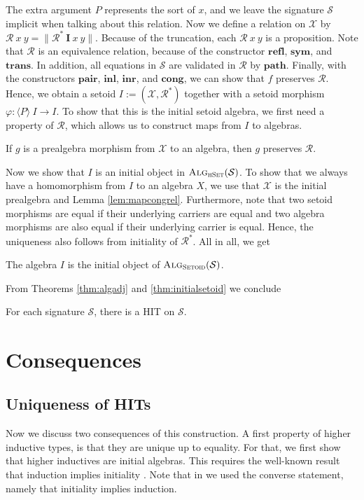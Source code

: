 \documentclass[9pt]{entcs}
\newcommand{\type}[1]{\textsc{#1}}
\newcommand{\constructor}[1]{\mathbf{#1}}
\newcommand{\category}[1]{\textsc{#1}}
\newcommand{\hset}{\type{hSet}} %
\newcommand{\0}{\textbf{0}} %
\newcommand{\trunct}[1]{\lVert #1 \rVert} %
\newcommand{\Def}{:=} %
\newcommand{\setoids}{\category{Setoid}} %
\newcommand{\I}{\constructor{I}} %
\newcommand{\sig}{\mathcal{S}} %
\newcommand{\Alg}[1]{\category{Alg}_{\hset}(#1)} %
\newcommand{\semPT}[1]{\langle #1 \rangle} %
\newcommand{\Algst}[1]{\category{Alg}_{\setoids}(#1)} %
\newcommand{\CRC}{\mathcal{X}} %
\newcommand{\CR}{\mathcal{R}^*} %
\newcommand{\CRR}{\mathcal{R}} %
\newcommand{\CRrefl}{\constructor{refl}} %
\newcommand{\CRsym}{\constructor{sym}} %
\newcommand{\CRtrans}{\constructor{trans}} %
\newcommand{\CRpair}{\constructor{pair}} %
\newcommand{\CRinl}{\constructor{inl}} %
\newcommand{\CRinr}{\constructor{inr}} %
\newcommand{\CRpath}{\constructor{path}} %
\newcommand{\CRcong}{\constructor{cong}} %
\begin{document}
The extra argument $P$ represents the sort of $x$, and we leave the signature $\sig$ implicit when talking about this relation.
Now we define a relation on $\CRC$ by $\CRR \> x \> y = \trunct{\CR \> \I \> x \> y}$.
Because of the truncation, each $\CRR \> x \> y$ is a proposition.
Note that $\CRR$ is an equivalence relation, because of the constructor $\CRrefl$, $\CRsym$, and $\CRtrans$.
In addition, all equations in $\sig$ are validated in $\CRR$ by $\CRpath$.
Finally, with the constructors $\CRpair$, $\CRinl$, $\CRinr$, and $\CRcong$, we can show that $f$ preserves $\CRR$.
Hence, we obtain a setoid $I \Def (\CRC, \CR)$ together with a setoid morphism $\varphi : \semPT{P} \> I \rightarrow I$.
To show that this is the initial setoid algebra, we first need a property of $\CRR$, which allows us to construct maps from $I$ to algebras.

\begin{lemma}
\label{lem:mapcongrel}
If $g$ is a prealgebra morphism from $\CRC$ to an algebra, then $g$ preserves $\CRR$.
\end{lemma}

Now we show that $I$ is an initial object in $\Alg{\sig}$.
To show that we always have a homomorphism from $I$ to an algebra $X$, we use that $\CRC$ is the initial prealgebra and Lemma \ref{lem:mapcongrel}.
Furthermore, note that two setoid morphisms are equal if their underlying carriers are equal and two algebra morphisms are also equal if their underlying carrier is equal.
Hence, the uniqueness also follows from initiality of $\CR$.
All in all, we get

\begin{theorem}
\label{thm:initialsetoid}
The algebra $I$ is the initial object of $\Algst{\sig}$.
\end{theorem}

From Theorems \ref{thm:algadj} and \ref{thm:initialsetoid} we conclude

\begin{corollary}
\label{thm:hit-exist}
For each signature $\sig$, there is a HIT on $\sig$.
\end{corollary}

\section{Consequences}
\label{sec:consequences}
\subsection{Uniqueness of HITs}
Now we discuss two consequences of this construction.
A first property of higher inductive types, is that they are unique up to equality.
For that, we first show that higher inductives are initial algebras.
This requires the well-known result that induction implies initiality \cite{AwodeyGS12,Sojakova15}.
Note that in  we used the converse statement, namely that initiality implies induction.
\end{document}
